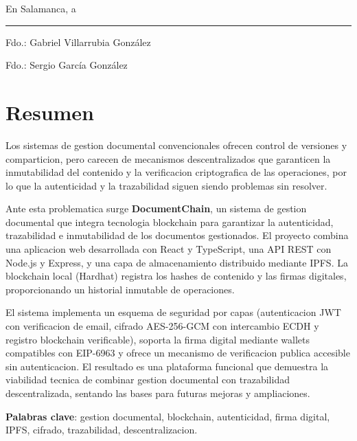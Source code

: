\documentclass[11pt, a4paper]{article}
\newcommand{\tutorUno}{Gabriel Villarrubia González}
\newcommand{\tutorDos}{Sergio García González}
\begin{document}
\vspace{3cm}
\begin{flushright}
    En Salamanca, a \rule{4cm}{0.4pt}
    \vspace{1cm}

    Fdo.: \tutorUno
    \vspace{0.5cm}

    Fdo.: \tutorDos
\end{flushright}

\newpage
\section*{Resumen}

Los sistemas de gestion documental convencionales ofrecen control de versiones y comparticion, pero carecen de mecanismos descentralizados que garanticen la inmutabilidad del contenido y la verificacion criptografica de las operaciones, por lo que la autenticidad y la trazabilidad siguen siendo problemas sin resolver.

Ante esta problematica surge \textbf{DocumentChain}, un sistema de gestion documental que integra tecnologia blockchain para garantizar la autenticidad, trazabilidad e inmutabilidad de los documentos gestionados. El proyecto combina una aplicacion web desarrollada con React y TypeScript, una API REST con Node.js y Express, y una capa de almacenamiento distribuido mediante IPFS. La blockchain local (Hardhat) registra los hashes de contenido y las firmas digitales, proporcionando un historial inmutable de operaciones.

El sistema implementa un esquema de seguridad por capas (autenticacion JWT con verificacion de email, cifrado AES-256-GCM con intercambio ECDH y registro blockchain verificable), soporta la firma digital mediante wallets compatibles con EIP-6963 y ofrece un mecanismo de verificacion publica accesible sin autenticacion. El resultado es una plataforma funcional que demuestra la viabilidad tecnica de combinar gestion documental con trazabilidad descentralizada, sentando las bases para futuras mejoras y ampliaciones.

\textbf{Palabras clave}: gestion documental, blockchain, autenticidad, firma digital, IPFS, cifrado, trazabilidad, descentralizacion.

\vspace{1cm}
\end{document}
